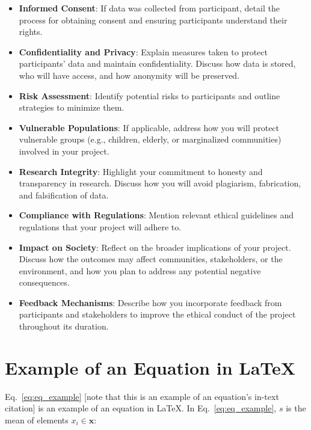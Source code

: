 \begin{itemize}
    \item \textbf{Informed Consent}: If data was collected from participant, detail the process for obtaining consent and ensuring participants understand their rights.
    
    \item \textbf{Confidentiality and Privacy}: Explain measures taken to protect participants' data and maintain confidentiality. Discuss how data is stored, who will have access, and how anonymity will be preserved.
    
    \item \textbf{Risk Assessment}: Identify potential risks to participants and outline strategies to minimize them. 
    
    \item \textbf{Vulnerable Populations}: If applicable, address how you will protect vulnerable groups (e.g., children, elderly, or marginalized communities) involved in your project. 
    
    \item \textbf{Research Integrity}: Highlight your commitment to honesty and transparency in research. Discuss how you will avoid plagiarism, fabrication, and falsification of data.
    
    \item \textbf{Compliance with Regulations}: Mention relevant ethical guidelines and regulations that your project will adhere to.
    
    \item \textbf{Impact on Society}: Reflect on the broader implications of your project. Discuss how the outcomes may affect communities, stakeholders, or the environment, and how you plan to address any potential negative consequences.
    
    \item \textbf{Feedback Mechanisms}: Describe how you incorporate feedback from participants and stakeholders to improve the ethical conduct of the project throughout its duration.

\end{itemize}


\section{Example of an Equation in \LaTeX}
Eq.~\ref{eq:eq_example} [note that this is an example of an equation's in-text citation] is an example of an equation in \LaTeX. In Eq.~\eqref{eq:eq_example}, $ s $ is the mean of elements $ x_i \in \mathbf{x} $: 

